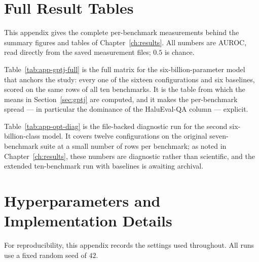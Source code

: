 \chapter{Full Result Tables}
\label{app:tables}

This appendix gives the complete per-benchmark measurements behind the summary figures and
tables of Chapter~\ref{ch:results}. All numbers are AUROC, read directly from the saved
measurement files; $0.5$ is chance.

Table~\ref{tab:app-gptj-full} is the full matrix for the six-billion-parameter model that
anchors the study: every one of the sixteen configurations and six baselines, scored on the
same rows of all ten benchmarks. It is the table from which the means in
Section~\ref{sec:gptj} are computed, and it makes the per-benchmark spread --- in particular
the dominance of the HaluEval-QA column --- explicit.



Table~\ref{tab:app-opt-diag} is the file-backed diagnostic run for the second
six-billion-class model. It covers twelve configurations on the original seven-benchmark
suite at a small number of rows per benchmark; as noted in Chapter~\ref{ch:results}, these
numbers are diagnostic rather than scientific, and the extended ten-benchmark run with
baselines is awaiting archival.



\chapter{Hyperparameters and Implementation Details}
\label{app:hyper}

For reproducibility, this appendix records the settings used throughout. All runs use a
fixed random seed of $42$.

